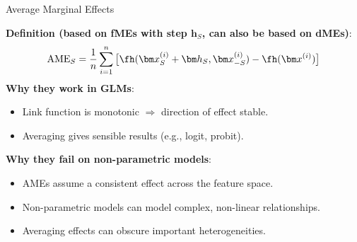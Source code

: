 \documentclass[11pt,compress,t,notes=noshow, aspectratio=169, xcolor=table]{beamer}
\begin{document}
\begin{frame}{Average Marginal Effects}


\textbf{Definition (based on fMEs with step $\bm h_S$, can also be based on dMEs)}:
$$\text{AME}_S = \frac{1}{n} \sum_{i=1}^n \big[\fh(\bm x_S^{(i)} + \bm h_S, \bm x_{-S}^{(i)}) - \fh(\bm x^{(i)})\big]$$
\textbf{Why they work in GLMs}:
\begin{itemize}\setlength\itemsep{0.25em}
\item Link function is monotonic $\Rightarrow$ direction of effect stable.
\item Averaging gives sensible results (e.g., logit, probit).
\end{itemize}

\vspace{0.2em}
\textbf{Why they fail on non-parametric models}:
\begin{itemize}%
\item AMEs assume a consistent effect across the feature space.
\item Non-parametric models can model complex, non-linear relationships.
\item Averaging effects can obscure important heterogeneities.
\end{itemize}


\end{frame}
\end{document}
